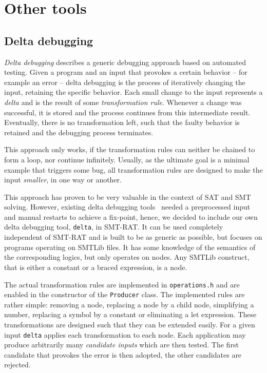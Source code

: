 \chapter{Other tools}
\label{chapter:further_features}

\section{Delta debugging}
\emph{Delta debugging} describes a generic debugging approach based on automated testing.
Given a program and an input that provokes a certain behavior -- for example an error -- delta debugging is the process of iteratively changing the input, retaining the specific behavior.
Each small change to the input represents a \emph{delta} and is the result of some \emph{transformation rule}.
Whenever a change was successful, it is stored and the process continues from this intermediate result.
Eventually, there is no transformation left, such that the faulty behavior is retained and the debugging process terminates.

This approach only works, if the transformation rules can neither be chained to form a loop, nor continue infinitely.
Usually, as the ultimate goal is a minimal example that triggers some bug, all transformation rules are designed to make the input \emph{smaller}, in one way or another.

This approach has proven to be very valuable in the context of SAT and SMT solving. However, existing delta debugging tools~\cite{Niemetz2013ddsmt} needed a preprocessed input and manual restarts to achieve a fix-point, hence, we decided to include our own delta debugging tool, \texttt{delta}, in SMT-RAT. It can be used completely independent of SMT-RAT and is built to be as generic as possible, but focuses on programs operating on SMTLib files.
It has some knowledge of the semantics of the corresponding logics, but only operates on nodes. Any SMTLib construct, that is either a constant or a braced expression, is a node.

The actual transformation rules are implemented in \texttt{operations.h} and are enabled in the constructor of the \texttt{Producer} class.
The implemented rules are rather simple: removing a node, replacing a node by a child node, simplifying a number, replacing a symbol by a constant or eliminating a let expression.
These transformations are designed such that they can be extended easily.
For a given input \texttt{delta} applies each transformation to each node.
Each application may produce arbitrarily many \emph{candidate inputs} which are then tested. The first candidate that provokes the error is then adopted, the other candidates are rejected.

